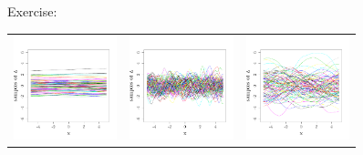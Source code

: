 \documentclass{beamer}
\begin{document}
\begin{frame}{}
\begin{exampleblock}{Exercise: }
\begin{center}
\begin{tabular}{ccc}
\includegraphics[height=3cm]{figures/R/MVN_traj150} &\includegraphics[height=3cm]{figures/R/MVN_traj105}& \includegraphics[height=3cm]{figures/R/MVN_traj33}
\end{tabular}
\end{center}
\end{exampleblock}
\end{frame}
\end{document}
